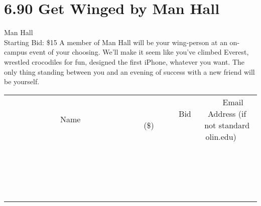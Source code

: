 \documentclass[11pt]{article}
\begin{document}
\section*{6.90 Get Winged by Man Hall}
Man Hall
\\
Starting Bid: \$15
\newline
A member of Man Hall will be your wing-person at an on-campus event of your choosing. We'll make it seem like you've climbed Everest, wrestled crocodiles for fun, designed the first iPhone, whatever you want. The only thing standing between you and an evening of success with a new friend will be yourself.
\\[3ex]
\begin{tabular}{c c c}
~~~~~~~~~~~~~Name~~~~~~~~~~~~~ & ~~~~~~~~~Bid (\$)~~~~~~~~~  & ~~~Email Address (if not standard olin.edu)~~~\\
 & & \\
\hline
 & & \\
\hline
 & & \\
\hline
 & & \\
\hline
 & & \\
\hline
 & & \\
\hline
 & & \\
\hline
 & & \\
\hline
 & & \\
\hline
 & & \\
\hline
 & & \\
\hline
 & & \\
\hline
 & & \\
\hline
 & & \\
\hline
 & & \\
\hline
 & & \\
\hline
 & & \\
\hline
 & & \\
\hline
 & & \\
\hline
\end{tabular}
\newpage
\end{document}
